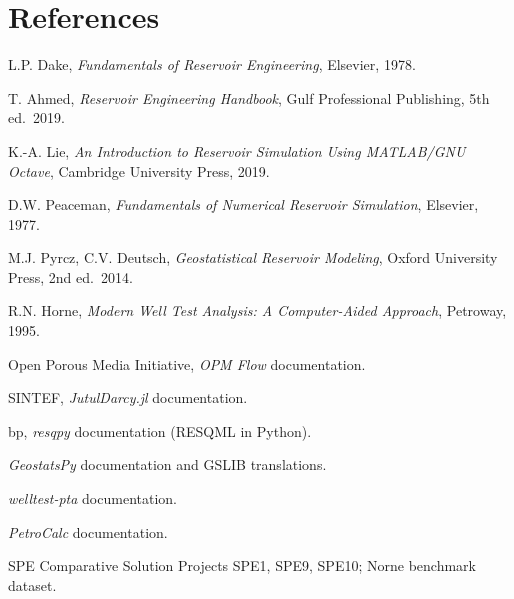 \documentclass[10pt,a4paper]{article}
\begin{document}
\section*{References}
\begin{enumerate}[leftmargin=1.6em,label={[\arabic*]}]
  \item L.P. Dake, \emph{Fundamentals of Reservoir Engineering}, Elsevier, 1978.
  \item T. Ahmed, \emph{Reservoir Engineering Handbook}, Gulf Professional Publishing, 5th ed.\ 2019.
  \item K.-A. Lie, \emph{An Introduction to Reservoir Simulation Using MATLAB/GNU Octave}, Cambridge University Press, 2019.
  \item D.W. Peaceman, \emph{Fundamentals of Numerical Reservoir Simulation}, Elsevier, 1977.
  \item M.J. Pyrcz, C.V. Deutsch, \emph{Geostatistical Reservoir Modeling}, Oxford University Press, 2nd ed.\ 2014.
  \item R.N. Horne, \emph{Modern Well Test Analysis: A Computer-Aided Approach}, Petroway, 1995.
  \item Open Porous Media Initiative, \emph{OPM Flow} documentation.
  \item SINTEF, \emph{JutulDarcy.jl} documentation.
  \item bp, \emph{resqpy} documentation (RESQML in Python).
  \item \emph{GeostatsPy} documentation and GSLIB translations.
  \item \emph{welltest-pta} documentation.
  \item \emph{PetroCalc} documentation.
  \item SPE Comparative Solution Projects SPE1, SPE9, SPE10; Norne benchmark dataset.
\end{enumerate}
\end{document}
